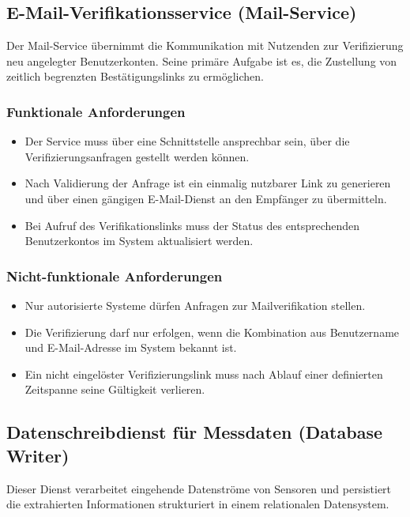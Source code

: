 \subsection{E-Mail-Verifikationsservice (Mail-Service)}

Der Mail-Service übernimmt die Kommunikation mit Nutzenden zur Verifizierung neu angelegter Benutzerkonten. Seine primäre Aufgabe ist es, die Zustellung von zeitlich begrenzten Bestätigungslinks zu ermöglichen.

\subsubsection{Funktionale Anforderungen}
\begin{itemize}
  \item Der Service muss über eine Schnittstelle ansprechbar sein, über die Verifizierungsanfragen gestellt werden können.
  \item Nach Validierung der Anfrage ist ein einmalig nutzbarer Link zu generieren und über einen gängigen E-Mail-Dienst an den Empfänger zu übermitteln.
  \item Bei Aufruf des Verifikationslinks muss der Status des entsprechenden Benutzerkontos im System aktualisiert werden.
\end{itemize}

\subsubsection{Nicht-funktionale Anforderungen}
\begin{itemize}
  \item Nur autorisierte Systeme dürfen Anfragen zur Mailverifikation stellen.
  \item Die Verifizierung darf nur erfolgen, wenn die Kombination aus Benutzername und E-Mail-Adresse im System bekannt ist.
  \item Ein nicht eingelöster Verifizierungslink muss nach Ablauf einer definierten Zeitspanne seine Gültigkeit verlieren.
\end{itemize}

\subsection{Datenschreibdienst für Messdaten (Database Writer)}

Dieser Dienst verarbeitet eingehende Datenströme von Sensoren und persistiert die extrahierten Informationen strukturiert in einem relationalen Datensystem.

